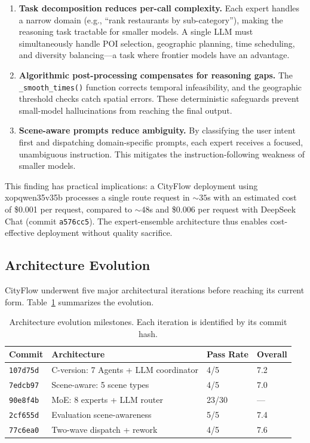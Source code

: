 \begin{enumerate}[leftmargin=*]
    \item \textbf{Task decomposition reduces per-call complexity.} Each expert handles a narrow domain (e.g., ``rank restaurants by sub-category''), making the reasoning task tractable for smaller models. A single LLM must simultaneously handle POI selection, geographic planning, time scheduling, and diversity balancing---a task where frontier models have an advantage.

    \item \textbf{Algorithmic post-processing compensates for reasoning gaps.} The \texttt{\_smooth\_times()} function corrects temporal infeasibility, and the geographic threshold checks catch spatial errors. These deterministic safeguards prevent small-model hallucinations from reaching the final output.

    \item \textbf{Scene-aware prompts reduce ambiguity.} By classifying the user intent first and dispatching domain-specific prompts, each expert receives a focused, unambiguous instruction. This mitigates the instruction-following weakness of smaller models.
\end{enumerate}

This finding has practical implications: a CityFlow deployment using xopqwen35v35b processes a single route request in ${\sim}35$s with an estimated cost of \$0.001 per request, compared to ${\sim}48$s and \$0.006 per request with DeepSeek Chat (commit \texttt{a576cc5}). The expert-ensemble architecture thus enables cost-effective deployment without quality sacrifice.

\subsection{Architecture Evolution}

CityFlow underwent five major architectural iterations before reaching its current form. Table~\ref{tab:arch_evolution} summarizes the evolution.

\begin{table}[H]
\centering
\caption{Architecture evolution milestones. Each iteration is identified by its commit hash.}
\label{tab:arch_evolution}
\begin{tabular}{@{}llll@{}}
\toprule
\textbf{Commit} & \textbf{Architecture} & \textbf{Pass Rate} & \textbf{Overall} \\
\midrule
\texttt{107d75d} & C-version: 7 Agents + LLM coordinator & 4/5 & 7.2 \\
\texttt{7edcb97} & Scene-aware: 5 scene types & 4/5 & 7.0 \\
\texttt{90e8f4b} & MoE: 8 experts + LLM router & 23/30 & --- \\
\texttt{2cf655d} & Evaluation scene-awareness & 5/5 & 7.4 \\
\texttt{77c6ea0} & Two-wave dispatch + rework & 4/5 & 7.6 \\
\bottomrule
\end{tabular}
\end{table}

